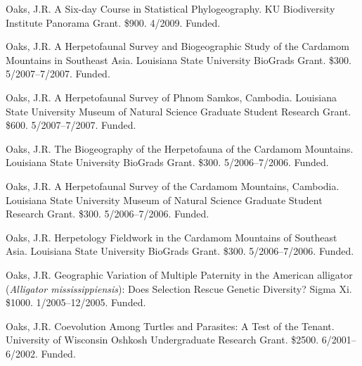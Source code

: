 \myHangIndent
Oaks, J.R.
A Six-day Course in Statistical Phylogeography.
KU Biodiversity Institute Panorama Grant.
\$900.
4/2009.
Funded.

\myHangIndent
Oaks, J.R.
A Herpetofaunal Survey and Biogeographic Study of the Cardamom Mountains in
Southeast Asia.
Louisiana State University BioGrads Grant.
\$300.
5/2007--7/2007.
Funded.

\myHangIndent
Oaks, J.R.
A Herpetofaunal Survey of Phnom Samkos, Cambodia.
Louisiana State University Museum of Natural Science Graduate Student Research
Grant.
\$600.
5/2007--7/2007.
Funded.

\myHangIndent
Oaks, J.R.
The Biogeography of the Herpetofauna of the Cardamom Mountains.
Louisiana State University BioGrads Grant.
\$300.
5/2006--7/2006.
Funded.

\myHangIndent
Oaks, J.R.
A Herpetofaunal Survey of the Cardamom Mountains, Cambodia.
Louisiana State University Museum of Natural Science Graduate Student Research
Grant.
\$300.
5/2006--7/2006.
Funded.

\myHangIndent
Oaks, J.R.
Herpetology Fieldwork in the Cardamom Mountains of Southeast Asia.
Louisiana State University BioGrads Grant.
\$300.
5/2006--7/2006.
Funded.

\myHangIndent
Oaks, J.R.
Geographic Variation of Multiple Paternity in the American alligator
(\emph{Alligator mississippiensis}): Does Selection Rescue Genetic Diversity?
Sigma Xi.
\$1000.
1/2005--12/2005.
Funded.

\myHangIndent
Oaks, J.R.
Coevolution Among Turtles and Parasites: A Test of the Tenant.
University of Wisconsin Oshkosh Undergraduate Research Grant.
\$2500.
6/2001--6/2002.
Funded.

